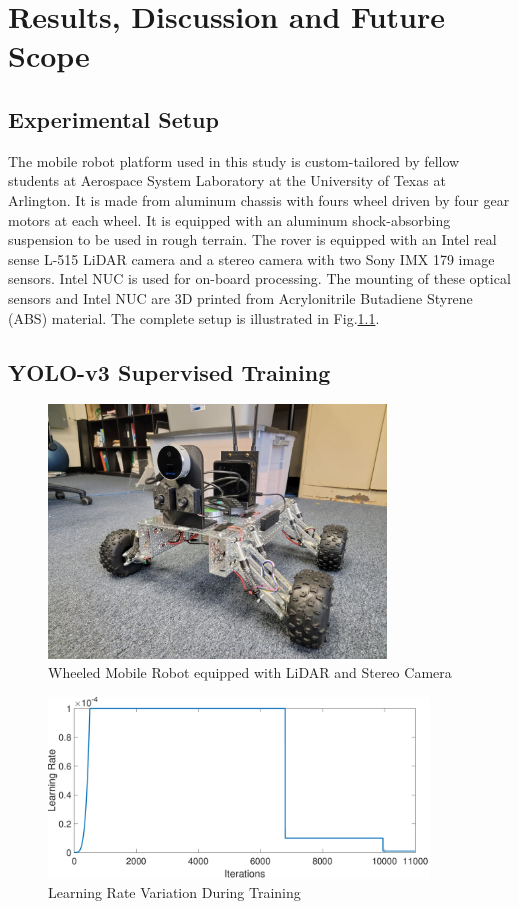 \chapter{Results, Discussion and Future Scope}
\label{ch:Results-Discussion-and-Future-Scope}

\section{Experimental Setup}
The mobile robot platform used in this study is custom-tailored by fellow students at Aerospace System Laboratory at the University of Texas at Arlington. It is made from aluminum chassis with fours wheel driven by four gear motors at each wheel. It is equipped with an aluminum shock-absorbing suspension to be used in rough terrain. The rover is equipped with an Intel real sense L-515 LiDAR camera and a stereo camera with two Sony IMX 179 image sensors. Intel NUC is used for on-board processing. The mounting of these optical sensors and Intel NUC are 3D printed from Acrylonitrile Butadiene Styrene (ABS) material. The complete setup is illustrated in Fig.\ref{setup}.  

\section{YOLO-v3 Supervised Training}

\begin{figure}
    \centering
    \includegraphics[width=0.8\textwidth]{Images/setup.png}
    \caption{Wheeled Mobile Robot equipped with LiDAR and Stereo Camera}
    \label{setup}
\end{figure}

\begin{figure}
    \centering
    \includegraphics[width=0.9\textwidth]{Images/LearningRate.pdf}
    \caption{Learning Rate Variation During Training}
    \label{learningrate}
\end{figure}

